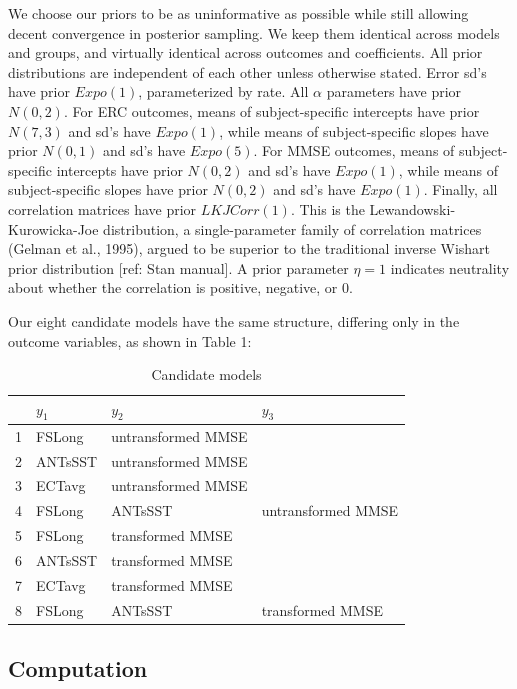\documentclass[12pt]{article}
\begin{document}
We choose our priors to be as uninformative as possible while still allowing decent convergence in posterior sampling. We keep them identical across models and groups, and virtually identical across outcomes and coefficients. All prior distributions are independent of each other unless otherwise stated. Error sd's have prior $Expo(1)$, parameterized by rate. All $\alpha$ parameters have prior $N(0,2)$. For ERC outcomes, means of subject-specific intercepts have prior $N(7,3)$ and sd's have $Expo(1)$, while means of subject-specific slopes have prior $N(0,1)$ and sd's have $Expo(5)$. For MMSE outcomes, means of subject-specific intercepts have prior $N(0,2)$ and sd's have $Expo(1)$, while means of subject-specific slopes have prior $N(0,2)$ and sd's have $Expo(1)$. Finally, all correlation matrices have prior $LKJCorr(1)$. This is the Lewandowski-Kurowicka-Joe distribution, a single-parameter 
family of correlation matrices (Gelman et al., 1995), argued to be superior to the traditional inverse Wishart prior distribution {\color{teal}[ref: Stan manual]}. A prior parameter $\eta=1$ indicates neutrality about whether the correlation is positive, negative, or 0. 

Our eight candidate models have the same structure, differing only in the  outcome variables, as shown in Table 1:

\begin{table}[H]
\centering
\caption{Candidate models}
\begin{tabular}{l|l|l|l}
\toprule
& $y_1$ & $y_2$ & $y_3$\\
\midrule
1 & FSLong & untransformed MMSE \\
2 & ANTsSST & untransformed MMSE \\
3 & ECTavg & untransformed MMSE \\
4 & FSLong & ANTsSST & untransformed MMSE \\
5 & FSLong & transformed MMSE \\
6 & ANTsSST & transformed MMSE \\
7 & ECTavg & transformed MMSE \\
8 & FSLong & ANTsSST & transformed MMSE \\
\bottomrule
\end{tabular}
\end{table}

\pagebreak
\subsection{Computation}
\end{document}
